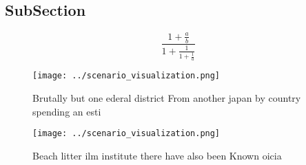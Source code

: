 \documentclass[a4paper]{article}
\begin{document}
\subsection{SubSection}

\[ \frac{1+\frac{a}{b}}{1+\frac{1}{1+\frac{1}{a}}} \]

\begin{figure}
\centering
\texttt{[image: ../scenario\_visualization.png]}
\caption{Brutally but one ederal district From another japan by country spending an esti
}
\end{figure}
 
\begin{figure}
\centering
\texttt{[image: ../scenario\_visualization.png]}
\caption{Beach litter ilm institute there have also been Known oicia
}
\end{figure}
 
\end{document}
